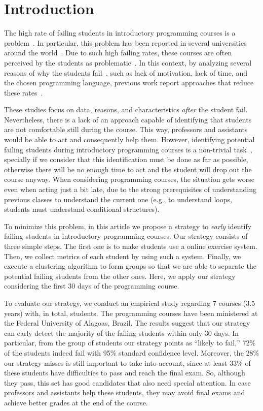 \section{Introduction}

The high rate of failing students in introductory programming courses is a problem~\cite{}. In particular, this problem has been reported in several universities around the world~\cite{}. Due to such high failing rates, these courses are often perceived by the students as problematic~\cite{yadin-inroads-acm-11}. In this context, by analyzing several reasons of why the students fail~\cite{why-dropout-icer06}, such as lack of motivation, lack of time, and the chosen programming language, previous work report approaches that reduce these rates~\cite{yadin-inroads-acm-11, xxx}.

These studies focus on data, reasons, and characteristics \textit{after} the student fail. Nevertheless, there is a lack of an approach capable of identifying that students are not comfortable still during the course. This way, professors and assistants would be able to act and consequently help them. However, identifying potential failing students during introductory programming courses is a non-trivial task~\cite{}, specially if we consider that this identification must be done as far as possible, otherwise there will be no enough time to act and the student will drop out the course anyway. When considering programming courses, the situation gets worse even when acting just a bit late, due to the strong prerequisites of understanding previous classes to understand the current one (e.g., to understand loops, students must understand conditional structures).

To minimize this problem, in this article we propose a strategy to \textit{early} identify failing students in introductory programming courses. Our strategy consists of three simple steps. The first one is to make students use a online exercise system. Then, we collect metrics of each student by using such a system. Finally, we execute a clustering algorithm to form groups so that we are able to separate the potential failing students from the other ones. Here, we apply our strategy considering the first 30 days of the programming course.

To evaluate our strategy, we conduct an empirical study regarding 7 courses (3.5 years) with, in total, \totalStudents students. The programming courses have been ministered at the Federal University of Alagoas, Brazil. The results suggest that our strategy can early detect the majority of the failing students within only 30 days. In particular, from the group of students our strategy points as ``likely to fail,'' 72\% of the students indeed fail with 95\% standard confidence level. Moreover, the 28\% our strategy misses is still important to take into account, since at least 33\% of these students have difficulties to pass and reach the final exam. So, although they pass, this set has good candidates that also need special attention. In case professors and assistants help these students, they may avoid final exams and achieve better grades at the end of the course.


